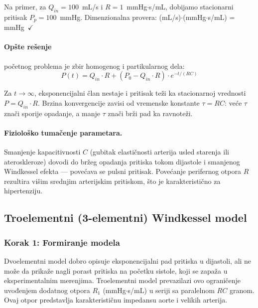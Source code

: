 \documentclass[12pt,a4paper]{article}
\begin{document}
Na primer, za $Q_{in} = 100$~mL/s i $R = 1$~mmHg$\cdot$s/mL, dobijamo stacionarni pritisak $P_p = 100$~mmHg. Dimenzionalna provera: (mL/s)$\cdot$(mmHg$\cdot$s/mL) = mmHg~$\checkmark$

\paragraph{Opšte rešenje} početnog problema je zbir homogenog i partikularnog dela:
\begin{equation}
    \boxed{P(t) = Q_{in} \cdot R + \left( P_0 - Q_{in} \cdot R \right) \cdot e^{-t/(RC)}}
    \label{eq:general_solution}
\end{equation}

Za $t \to \infty$, eksponencijalni član nestaje i pritisak teži ka stacionarnoj vrednosti $P = Q_{in} \cdot R$. Brzina konvergencije zavisi od vremenske konstante $\tau = RC$: veće $\tau$ znači sporije opadanje, a manje $\tau$ znači brži pad ka ravnoteži.

\paragraph{Fiziološko tumačenje parametara.}
Smanjenje kapacitivnosti $C$ (gubitak elastičnosti arterija usled starenja ili ateroskleroze) dovodi do bržeg opadanja pritiska tokom dijastole i smanjenog Windkessel efekta --- povećava se pulsni pritisak. Povećanje perifernog otpora $R$ rezultira višim srednjim arterijskim pritiskom, što je karakteristično za hipertenziju.


\subsection{Troelementni (3-elementni) Windkessel model}

\subsubsection{Korak 1: Formiranje modela}

Dvoelementni model dobro opisuje eksponencijalni pad pritiska u dijastoli, ali ne može da prikaže nagli porast pritiska na početku sistole, koji se zapaža u eksperimentalnim merenjima. Troelementni model prevazilazi ovo ograničenje uvođenjem dodatnog otpora $R_1$ (mmHg$\cdot$s/mL) u seriji sa paralelnom $RC$ granom. Ovaj otpor predstavlja karakterističnu impedansu aorte i velikih arterija.
\end{document}
